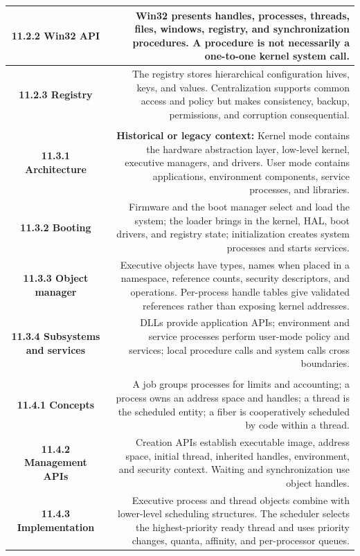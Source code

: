 \documentclass[10pt,letterpaper]{article}
\begin{document}
\begin{longtable}{C N}
\textbf{11.2.2 Win32 API} & Win32 presents handles, processes, threads, files, windows, registry, and synchronization procedures. A procedure is not necessarily a one-to-one kernel system call.\\\hline
\textbf{11.2.3 Registry} & The registry stores hierarchical configuration hives, keys, and values. Centralization supports common access and policy but makes consistency, backup, permissions, and corruption consequential.\\\hline
{}\\*\hline
\textbf{11.3.1 Architecture} & \textcolor{legacy}{\textbf{Historical or legacy context:}} Kernel mode contains the hardware abstraction layer, low-level kernel, executive managers, and drivers. User mode contains applications, environment components, service processes, and libraries.\\\hline
\textbf{11.3.2 Booting} & Firmware and the boot manager select and load the system; the loader brings in the kernel, HAL, boot drivers, and registry state; initialization creates system processes and starts services.\\\hline
\textbf{11.3.3 Object manager} & Executive objects have types, names when placed in a namespace, reference counts, security descriptors, and operations. Per-process handle tables give validated references rather than exposing kernel addresses.\\\hline
\textbf{11.3.4 Subsystems and services} & DLLs provide application APIs; environment and service processes perform user-mode policy and services; local procedure calls and system calls cross boundaries.\\\hline
{}\\*\hline
\textbf{11.4.1 Concepts} & A job groups processes for limits and accounting; a process owns an address space and handles; a thread is the scheduled entity; a fiber is cooperatively scheduled by code within a thread.\\\hline
\textbf{11.4.2 Management APIs} & Creation APIs establish executable image, address space, initial thread, inherited handles, environment, and security context. Waiting and synchronization use object handles.\\\hline
\textbf{11.4.3 Implementation} & Executive process and thread objects combine with lower-level scheduling structures. The scheduler selects the highest-priority ready thread and uses priority changes, quanta, affinity, and per-processor queues.\\\hline

\end{longtable}
\end{document}
